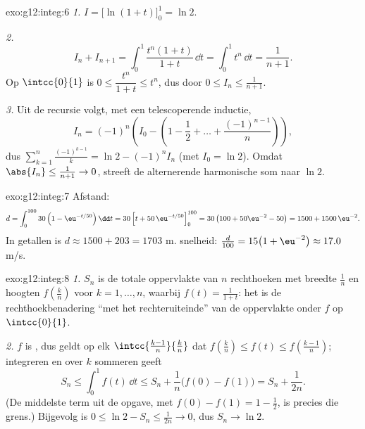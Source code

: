 \begin{solution}{exo:g12:integ:6}
\emph{1.} $I = \bigl[\ln(1+t)\bigr]_0^1 = \ln 2$.

\emph{2.}
\[
I_n + I_{n+1} = \int_0^1 \frac{t^n(1 + t)}{1+t}\,\dd t
= \int_0^1 t^n \,\dd t = \frac{1}{n+1}.
\]
Op $\intcc{0}{1}$ is $0 \leq \dfrac{t^n}{1+t} \leq t^n$, dus door
 $0 \leq I_n \leq \frac{1}{n+1}$.

\emph{3.} Uit de recursie volgt, met een telescoperende inductie,
\[
I_n = (-1)^n\left(I_0 - \left(1 - \frac12 + \dots + \frac{(-1)^{n-1}}{n}\right)\right),
\]
dus $\displaystyle\sum_{k=1}^{n} \frac{(-1)^{k-1}}{k} = \ln 2 - (-1)^n I_n$
(met $I_0 = \ln 2$). Omdat $\abs{I_n} \leq \frac{1}{n+1} \to 0$, streeft de
alternerende harmonische som naar $\ln 2$.
\end{solution}

\begin{solution}{exo:g12:integ:7}
Afstand:
\[
d = \int_0^{100} 30\left(1 - \eu^{-t/50}\right)\dd t
= 30\left[t + 50\,\eu^{-t/50}\right]_0^{100}
= 30\left(100 + 50\eu^{-2} - 50\right)
= 1500 + 1500\,\eu^{-2}.
\]
In getallen is $d \approx 1500 + 203 = 1703$ m.  snelheid:
$\frac{d}{100} = 15\bigl(1 + \eu^{-2}\bigr) \approx 17.0$ m/s.
\end{solution}

\begin{solution}{exo:g12:integ:8}
\emph{1.} $S_n$ is de totale oppervlakte van $n$ rechthoeken met breedte
$\frac1n$ en hoogten $f\left(\frac kn\right)$ voor $k = 1, \dots, n$, waarbij
$f(t) = \frac{1}{1+t}$: het is de rechthoekbenadering ``met het rechteruiteinde''
van de oppervlakte onder $f$ op $\intcc{0}{1}$.

\emph{2.} $f$ is , dus geldt op elk 
$\intcc{\frac{k-1}{n}}{\frac kn}$ dat
$f\left(\frac kn\right) \leq f(t) \leq f\left(\frac{k-1}{n}\right)$;
integreren en over $k$ sommeren geeft
\[
S_n \leq \int_0^1 f(t)\,\dd t \leq S_n + \frac1n\bigl(f(0) - f(1)\bigr)
= S_n + \frac{1}{2n}.
\]
(De middelste term uit de opgave, met $f(0) - f(1) = 1 - \frac12$, is precies
die grens.) Bijgevolg is $0 \leq \ln 2 - S_n \leq \frac{1}{2n} \to 0$, dus
$S_n \to \ln 2$.
\end{solution}

